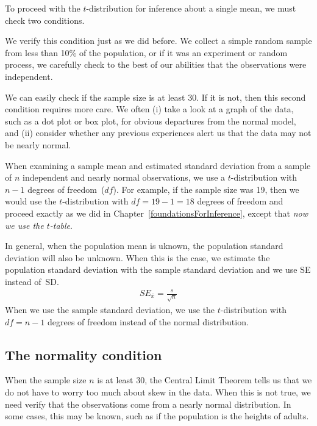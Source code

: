 
To proceed with the $t$-distribution for inference about a single mean, we must check two conditions.
\begin{description}
\setlength{\itemsep}{0mm}
\item[Independence of observations.] We verify this condition just as we did before. We collect a simple random sample from less than 10\% of the population, or if it was an experiment or random process, we carefully check to the best of our abilities that the observations were independent.
\item[$\mathbf{n\ge 30}$ or observations come from a nearly normal distribution.] We can easily check if the sample size is at least 30. If it is not, then this second condition requires more care. We often (i) take a look at a graph of the data, such as a dot plot or box plot, for obvious departures from the normal model, and (ii) consider whether any previous experiences alert us that the data may not be nearly normal.
\end{description}
When examining a sample mean and estimated standard deviation from a sample of $n$ independent and nearly normal observations, we use a $t$-distribution with $n-1$ degrees of freedom~($df$). For example, if the sample size was 19, then we would use the $t$-distribution with $df=19-1=18$ degrees of freedom and proceed exactly as we did in Chapter~\ref{foundationsForInference}, except that \emph{now we use the $t$-table}.

\begin{termBox}{
In general, when the population mean is uknown, the population standard deviation will also be unknown. When this is the case, we estimate the population standard deviation with the sample standard deviation and we use SE instead of~SD.
\begin{align*}
SE_{\bar{x}}=\frac{s}{\sqrt{n}}
\end{align*}
When we use the sample standard deviation, we use the $t$-distribution with $df=n-1$ degrees of freedom instead of the normal distribution.}
\end{termBox}

\subsection{The normality condition}
\label{normalityCond}

When the sample size $n$ is at least 30, the Central Limit Theorem tells us that we do not have to worry too much about skew in the data. When this is not true, we need verify that the observations come from a nearly normal distribution. In some cases, this may be known, such as if the population is the heights of adults.


